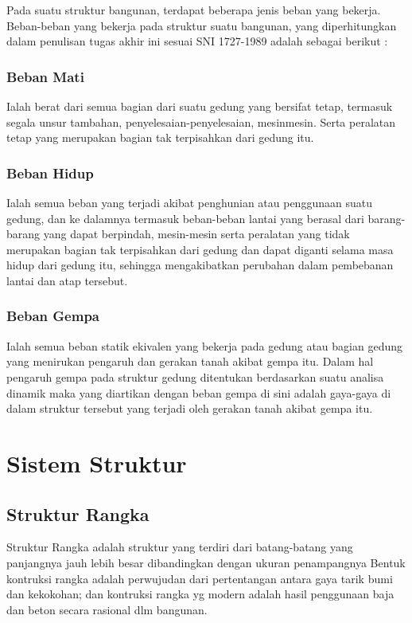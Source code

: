 \documentclass[../modul_skb.tex]{subfiles}
\begin{document}
Pada suatu struktur bangunan, terdapat beberapa jenis beban yang bekerja. Beban-beban yang bekerja pada struktur suatu bangunan, yang diperhitungkan dalam penulisan tugas akhir ini sesuai SNI 1727-1989 adalah sebagai berikut :

\subsubsection{Beban Mati}%
\label{ssub:Beban Mati}

Ialah berat dari semua bagian dari suatu gedung yang bersifat tetap, termasuk segala unsur tambahan, penyelesaian-penyelesaian, mesinmesin. Serta peralatan tetap yang merupakan bagian tak terpisahkan dari gedung itu.

\subsubsection{Beban Hidup}%
\label{ssub:Beban Hidup}

Ialah semua beban yang terjadi akibat penghunian atau penggunaan suatu gedung, dan ke dalamnya termasuk beban-beban lantai yang berasal dari barang-barang yang dapat berpindah, mesin-mesin serta peralatan yang tidak merupakan bagian tak terpisahkan dari gedung dan dapat diganti selama masa hidup dari gedung itu, sehingga mengakibatkan perubahan dalam pembebanan lantai dan atap tersebut.

\subsubsection{Beban Gempa}%
\label{ssub:Beban Gempa}

Ialah semua beban statik ekivalen yang bekerja pada gedung atau bagian gedung yang menirukan pengaruh dan gerakan tanah akibat gempa itu. Dalam hal pengaruh gempa pada struktur gedung ditentukan berdasarkan suatu analisa dinamik maka yang diartikan dengan beban gempa di sini adalah gaya-gaya di dalam struktur tersebut yang terjadi oleh gerakan tanah akibat gempa itu.

\section{Sistem Struktur}%
\label{sec:Sistem Struktur}

\subsection{Struktur Rangka}%
\label{sub:Struktur Rangka}
Struktur Rangka adalah struktur yang terdiri dari batang-batang yang panjangnya jauh lebih besar dibandingkan dengan ukuran penampangnya Bentuk kontruksi rangka adalah perwujudan dari pertentangan antara gaya tarik bumi dan kekokohan; dan kontruksi rangka yg modern adalah hasil penggunaan baja dan beton secara rasional dlm bangunan.
\end{document}
